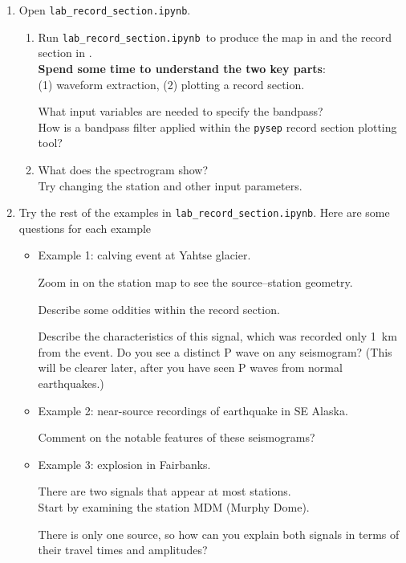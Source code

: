 \documentclass[11pt,titlepage,fleqn]{article}
\newcommand{\tfile}{{\tt lab\_record\_section.ipynb}}
\begin{document}
\begin{enumerate}

\item Open \tfile.
%
\begin{enumerate}
\item Run \tfile\ to produce the map in  and the record section in . \\
{\bf Spend some time to understand the two key parts}: \\
(1) waveform extraction, (2) plotting a record section.

What input variables are needed to specify the bandpass? \\
How is a bandpass filter applied within the \verb+pysep+ record section plotting tool?

\item What does the spectrogram show? \\
Try changing the station and other input parameters.

\end{enumerate}


\pagebreak
\item Try the rest of the examples in \tfile. Here are some questions for each example
%
\begin{itemize}
\item Example 1: calving event at Yahtse glacier. 

Zoom in on the station map to see the source--station geometry.

Describe some oddities within the record section.

Describe the characteristics of this signal, which was recorded only 1~km from the event. Do you see a distinct P wave on any seismogram? (This will be clearer later, after you have seen P waves from normal earthquakes.)

\item Example 2: near-source recordings of  earthquake in SE Alaska. 

Comment on the notable features of these seismograms?

\item Example 3: explosion in Fairbanks. 

There are two signals that appear at most stations. \\
Start by examining the station MDM (Murphy Dome).

There is only one source, so how can you explain both signals in terms of their travel times and amplitudes?


\end{itemize}
\end{enumerate}
\end{document}
